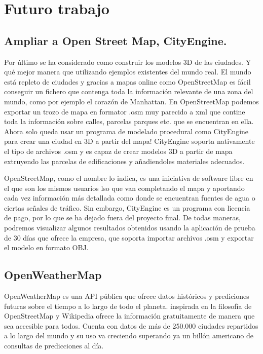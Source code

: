 \documentclass[12pt,a4paper,openright,oneside]{article}
\numberwithin{equation}{section}
\theoremstyle{definition}
\begin{document}
\newpage



\section{Futuro trabajo}

\subsection{ Ampliar a Open Street Map, CityEngine.}
Por último se ha considerado como construir los modelos 3D de las ciudades. Y qué mejor manera que utilizando ejemplos existentes del mundo real. El mundo está repleto de ciudades y gracias a mapas online como OpenStreetMap es fácil conseguir un fichero que contenga toda la información relevante de una zona del mundo, como por ejemplo el corazón de Manhattan. En OpenStreetMap podemos exportar un trozo de mapa en formator .osm muy parecido a xml que contine toda la información sobre calles, parcelas parques etc. que se encuentran en ella. Ahora solo queda usar un programa de modelado procedural como CityEngine para crear una ciudad en 3D a partir del mapa! CityEngine soporta nativamente el tipo de archivos .osm y es capaz de crear modelos 3D a partir de mapa extruyendo las parcelas de edificaciones y añadiendoles materiales adecuados. 

OpenStreetMap, como el nombre lo indica, es una iniciativa de software libre en el que son los mismos usuarios lso que van completando el mapa y aportando cada vez información más detallada como donde se encuentran fuentes de agua o ciertas señales de tráfico. Sin embargo, CityEngine es un programa con licencia de pago, por lo que se ha dejado fuera del proyecto final. De todas maneras, podremos visualizar algunos resultados obtenidos usando la aplicación de prueba de 30 días que ofrece la empresa, que soporta importar archivos .osm y exportar el modelo en formato OBJ.


\subsection{OpenWeatherMap}
OpenWeatherMap es una API pública que ofrece datos históricos y prediciones futuras sobre el tiempo a lo largo de todo el planeta. inspirada en la filosofía de OpenStreetMap y Wikipedia ofrece la información gratuitamente de manera que sea accesible para todos. Cuenta con datos de más de 250.000 ciudades repartidos a lo largo del mundo y su uso va creciendo superando ya un billón americano de consultas de predicciones al día.
\end{document}
